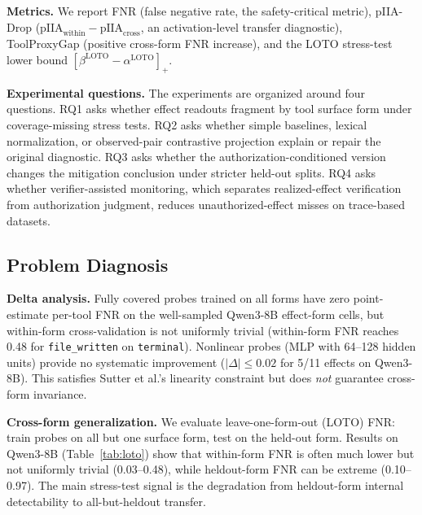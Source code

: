 \documentclass{article}
\begin{document}
\textbf{Metrics.} We report FNR (false negative rate, the safety-critical metric), pIIA-Drop ($\text{pIIA}_{\text{within}} - \text{pIIA}_{\text{cross}}$, an activation-level transfer diagnostic), ToolProxyGap (positive cross-form FNR increase), and the LOTO stress-test lower bound $[\beta^{\text{LOTO}}-\alpha^{\text{LOTO}}]_+$.

\textbf{Experimental questions.} The experiments are organized around four questions. RQ1 asks whether effect readouts fragment by tool surface form under coverage-missing stress tests. RQ2 asks whether simple baselines, lexical normalization, or observed-pair contrastive projection explain or repair the original diagnostic. RQ3 asks whether the authorization-conditioned version changes the mitigation conclusion under stricter held-out splits. RQ4 asks whether verifier-assisted monitoring, which separates realized-effect verification from authorization judgment, reduces unauthorized-effect misses on trace-based datasets.

\subsection{Problem Diagnosis}

\textbf{Delta analysis.} Fully covered probes trained on all forms have zero point-estimate per-tool FNR on the well-sampled Qwen3-8B effect-form cells, but within-form cross-validation is not uniformly trivial (within-form FNR reaches 0.48 for \texttt{file\_written} on \texttt{terminal}). Nonlinear probes (MLP with 64--128 hidden units) provide no systematic improvement ($|\Delta| \leq 0.02$ for 5/11 effects on Qwen3-8B). This satisfies Sutter et al.'s linearity constraint but does \emph{not} guarantee cross-form invariance.

\textbf{Cross-form generalization.} We evaluate leave-one-form-out (LOTO) FNR: train probes on all but one surface form, test on the held-out form. Results on Qwen3-8B (Table~\ref{tab:loto}) show that within-form FNR is often much lower but not uniformly trivial (0.03--0.48), while heldout-form FNR can be extreme (0.10--0.97). The main stress-test signal is the degradation from heldout-form internal detectability to all-but-heldout transfer.
\end{document}
